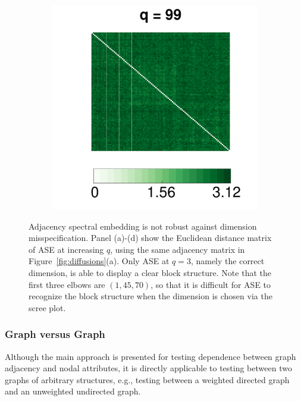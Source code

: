 \documentclass[11pt]{article}
\theoremstyle{definition}
\begin{document}
\begin{figure}[!ht]
\begin{subfigure}[b]{0.23\textwidth}
	\caption{}
	\label{fig:e10}
	\end{subfigure}
	\begin{subfigure}[b]{0.23\textwidth}
	\includegraphics[width=\textwidth]{../Figure/E99.pdf}
	\caption{}
	\label{fig:e99}
	\end{subfigure}
	\caption{Adjacency spectral embedding is not robust against dimension misspecification. Panel (a)-(d) show the Euclidean distance matrix of ASE at increasing $q$, using the same adjacency matrix in Figure~\ref{fig:diffusions}(a). Only ASE at $q=3$, namely the correct dimension, is able to display a clear block structure. Note that the first three elbows are $(1,45,70)$, so that it is difficult for ASE to recognize the block structure when the dimension is chosen via the scree plot.}
\label{fig:embedding}
\end{figure}

\subsubsection*{Graph versus Graph}
Although the main approach is presented for testing dependence between graph adjacency and nodal attributes, it is directly applicable to testing between two graphs of arbitrary structures, e.g., testing between a weighted directed graph and an unweighted undirected graph. 
\end{document}
